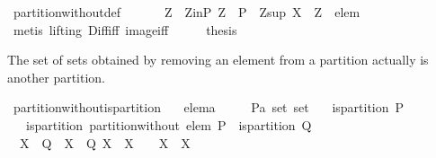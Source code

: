 \begin{isabellebody}
\ partition{\isacharunderscore}without{\isacharunderscore}def\ \isacommand{{\isachardot}}\isamarkupfalse%
\isanewline
\ \ \isamarkupfalse%
\ \isamarkupfalse%
\ Z\ \ Z{\isacharunderscore}in{\isacharunderscore}P{\isacharcolon}\ {\isachardoublequoteopen}Z\ {\isasymin}\ P{\isachardoublequoteclose}\ \ Z{\isacharunderscore}sup{\isacharcolon}\ {\isachardoublequoteopen}X\ {\isacharequal}\ Z\ {\isacharminus}\ {\isacharbraceleft}elem{\isacharbraceright}{\isachardoublequoteclose}\isanewline
\ \ \ \ \isamarkupfalse%
\ {\isacharparenleft}metis\ {\isacharparenleft}lifting{\isacharparenright}\ Diff{\isacharunderscore}iff\ image{\isacharunderscore}iff{\isacharparenright}\isanewline
\ \ \isamarkupfalse%
\ \isamarkupfalse%
\ {\isacharquery}thesis\ \isacommand{{\isachardot}{\isachardot}}\isamarkupfalse%
\isanewline
{}\isamarkupfalse%
%
\endisatagproof
{\isafoldproof}%
%
\isadelimproof
%
\endisadelimproof
%
\begin{isamarkuptext}%
The set of sets obtained by removing an element from a partition actually is another
  partition.%
\end{isamarkuptext}%
\isamarkuptrue%
\isamarkupfalse%
\ partition{\isacharunderscore}without{\isacharunderscore}is{\isacharunderscore}partition{\isacharcolon}\isanewline
\ \ \ elem{\isacharcolon}{\isacharcolon}{\isacharprime}a\isanewline
\ \ \ \ \ P{\isacharcolon}{\isacharcolon}{\isachardoublequoteopen}{\isacharprime}a\ set\ set{\isachardoublequoteclose}\isanewline
\ \ \ {\isachardoublequoteopen}is{\isacharunderscore}partition\ P{\isachardoublequoteclose}\isanewline
\ \ \ {\isachardoublequoteopen}is{\isacharunderscore}partition\ {\isacharparenleft}partition{\isacharunderscore}without\ elem\ P{\isacharparenright}{\isachardoublequoteclose}\ {\isacharparenleft}\ {\isachardoublequoteopen}is{\isacharunderscore}partition\ {\isacharquery}Q{\isachardoublequoteclose}{\isacharparenright}\isanewline
%
\isadelimproof
%
\endisadelimproof
%
\isatagproof
{}\isamarkupfalse%
\ {\isacharminus}\ \ \ \isanewline
\ \ \isamarkupfalse%
\ {\isachardoublequoteopen}{\isasymforall}\ X{}\ {\isasymin}\ {\isacharquery}Q{\isachardot}\ {\isasymforall}\ X{}\ {\isasymin}\ {\isacharquery}Q{\isachardot}\ X{}\ {\isasyminter}\ X{}\ {\isasymnoteq}\ {\isacharbraceleft}{\isacharbraceright}\ {\isasymlongleftrightarrow}\ X{}\ {\isacharequal}\ X{}{\isachardoublequoteclose}\isanewline

\end{isabellebody}
